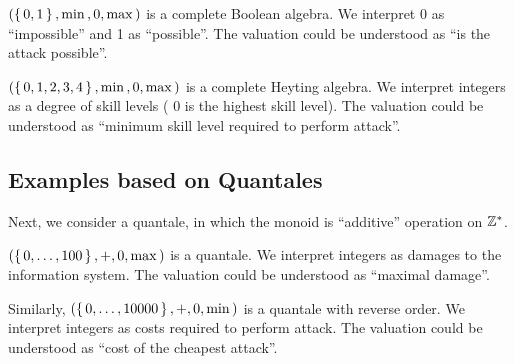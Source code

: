 \begin{example}
$(\set{0,1},\min{},0,\max{})$ is a complete Boolean algebra. 
We interpret 0 as ``impossible'' and 1 as ``possible''.
The valuation could be understood as ``is the attack possible''. 
\end{example}
\begin{example}
$(\set{0,1,2,3,4},\min{},0,\max{})$ is a complete Heyting algebra.
We interpret integers as a degree of skill levels ( $0$ is the highest skill level). 
The valuation could be understood as ``minimum skill level required to perform attack''. 
\end{example}
\subsection{Examples based on Quantales }
Next, we consider a quantale, 
in which the monoid  is ``additive'' operation on ${\mathbb{Z}}^{*}$.
\begin{example}
$(\set{0, \ldots, 100},+,0,\max{})$ is a quantale. 
We interpret integers as damages to the information system. 
The valuation could be understood as ``maximal damage''. 
\end{example}
\begin{example}
Similarly, $(\set{0, \ldots, 10000},+,0,\min{})$ is a quantale with reverse order. 
We interpret integers as costs  required to perform attack. 
The valuation could be understood as ``cost of the cheapest attack''.
\end{example}

